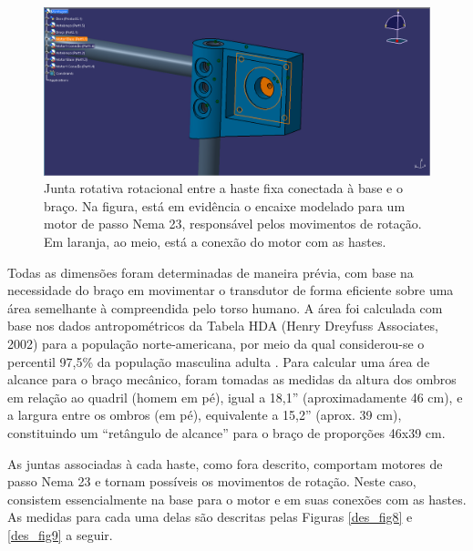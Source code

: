 \begin{figure}[H]
	\centering	\includegraphics[keepaspectratio=true,scale=0.4]{figuras/braco_mecanico_3.png}
	\caption{Junta rotativa rotacional entre a haste fixa conectada à base e o braço. Na figura, está em evidência o encaixe modelado para um motor de passo Nema 23, responsável pelos movimentos de rotação. Em laranja, ao meio, está a conexão do motor com as hastes.}
	\label{des_fig7}
\end{figure}
Todas as dimensões foram determinadas de maneira prévia, com base na necessidade do braço em movimentar o transdutor de forma eficiente sobre uma área semelhante à compreendida pelo torso humano. A área foi calculada com base nos dados antropométricos da Tabela HDA (Henry Dreyfuss Associates, 2002) para a população norte-americana, por meio da qual considerou-se o percentil 97,5\% da população masculina adulta \cite{alvintilley2007}. Para calcular uma área de alcance para o braço mecânico, foram tomadas as medidas da altura dos ombros em relação ao quadril (homem em pé), igual a 18,1” (aproximadamente 46 cm), e a largura entre os ombros (em pé), equivalente a 15,2” (aprox. 39 cm), constituindo um “retângulo de alcance” para o braço de proporções 46x39 cm.

As juntas associadas à cada haste, como fora descrito, comportam motores de passo Nema 23 e tornam possíveis os movimentos de rotação. Neste caso, consistem essencialmente na base para o motor e em suas conexões com as hastes. As medidas para cada uma delas são descritas pelas Figuras \ref{des_fig8} e \ref{des_fig9} a seguir.

